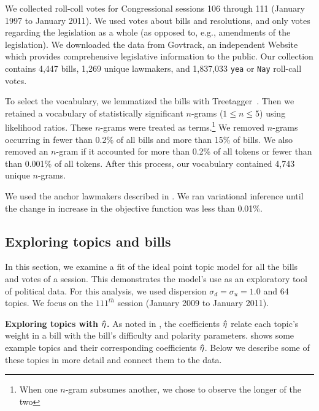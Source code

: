 We collected roll-coll votes for Congressional sessions 106 through
111 (January 1997 to January 2011).  We used votes about bills and
resolutions, and only votes regarding the legislation as a whole
(as opposed to, e.g., amendments of the legislation). We downloaded
the data from Govtrack, an independent Website which provides
comprehensive legislative information to the public.  Our
collection contains 4,447 bills, 1,269 unique lawmakers, and
1,837,033 \verb!yea! or \verb!Nay! roll-call votes.

To select the vocabulary, we lemmatized the bills with
Treetagger~\citep{treetagger}.  Then we retained a vocabulary of
statistically significant $n$-grams ($1 \le n \le 5$) using likelihood
ratios.  These $n$-grams were treated as terms.\footnote{When one
  $n$-gram subsumes another, we chose to observe the longer of the
  two}  We removed $n$-grams occurring in fewer than 0.2\% of all
bills and more than 15\% of bills.  We also removed an
$n$-gram if it accounted for more than 0.2\% of all tokens or fewer
than than 0.001\% of all tokens.  After this process, our vocabulary
contained 4,743 unique $n$-grams.

We used the anchor lawmakers described in .  We ran
variational inference until the change in increase in the objective
function was less than 0.01\%.

\subsection*{Exploring topics and bills}

In this section, we examine a fit of the ideal point topic model for
all the bills and votes of a session.  This demonstrates the model's
use as an exploratory tool of political data.  For this analysis, we
used dispersion $\sigma_d = \sigma_u = 1.0$ and 64 topics.  We focus
on the $111^{th}$ session (January 2009 to January 2011).

\textbf{Exploring topics with $\bm \hat \eta$.} As noted in , the
coefficients $\bm \hat \eta$ relate each topic's weight in a bill with the
bill's difficulty and polarity parameters.  shows
some example topics and their corresponding coefficients $\bm \hat \eta$.  Below
we describe some of these topics in more detail and connect them to
the data.


